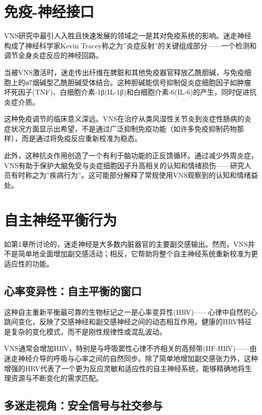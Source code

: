 \documentclass[
  Letterpaper,
]{scrbook}
\begin{document}
\section{免疫-神经接口}\label{ux514dux75ab-ux795eux7ecfux63a5ux53e3}

VNS研究中最引人入胜且快速发展的领域之一是其对免疫系统的影响。迷走神经构成了神经科学家Kevin
Tracey称之为''炎症反射''的关键组成部分------一个检测和调节全身炎症反应的神经回路。

当被VNS激活时，迷走传出纤维在脾脏和其他免疫器官释放乙酰胆碱，与免疫细胞上的α7烟碱型乙酰胆碱受体结合。这种胆碱能信号抑制促炎症细胞因子如肿瘤坏死因子(TNF)、白细胞介素-1β(IL-1β)和白细胞介素-6(IL-6)的产生，同时促进抗炎症介质。

这种免疫调节的临床意义深远。VNS在治疗从类风湿性关节炎到炎症性肠病的炎症状况方面显示出希望，不是通过广泛抑制免疫功能（如许多免疫抑制药物那样），而是通过将免疫反应重新校准为稳态。

此外，这种抗炎作用创造了一个有利于脑功能的正反馈循环。通过减少外周炎症，VNS有助于保护大脑免受与炎症细胞因子升高相关的认知和情绪损伤------研究人员有时称之为''疾病行为''。这可能部分解释了常规使用VNS观察到的认知和情绪益处。

\section{自主神经平衡行为}\label{ux81eaux4e3bux795eux7ecfux5e73ux8861ux884cux4e3a}

如第1章所讨论的，迷走神经是大多数内脏器官的主要副交感输出。然而，VNS并不是简单地全面增加副交感活动；相反，它帮助将整个自主神经系统重新校准为更适应性的功能。

\subsection{心率变异性：自主平衡的窗口}\label{ux5fc3ux7387ux53d8ux5f02ux6027ux81eaux4e3bux5e73ux8861ux7684ux7a97ux53e3}

这种自主重新平衡最可靠的生物标记之一是心率变异性(HRV)------心律中自然的心跳间变化，反映了交感神经和副交感神经之间的动态相互作用。健康的HRV特征是复杂的变化模式，而不是刚性规律性或混乱波动。

VNS通常会增加HRV，特别是与呼吸窦性心律不齐相关的高频带(HF-HRV)------由迷走神经介导的呼吸与心率之间的自然同步。除了简单地增加副交感张力外，这种增强的HRV代表了一个更为反应灵敏和适应性的自主神经系统，能够精确地将生理资源与不断变化的需求匹配。

\subsection{多迷走视角：安全信号与社交参与}\label{ux591aux8ff7ux8d70ux89c6ux89d2ux5b89ux5168ux4fe1ux53f7ux4e0eux793eux4ea4ux53c2ux4e0e}
\end{document}
